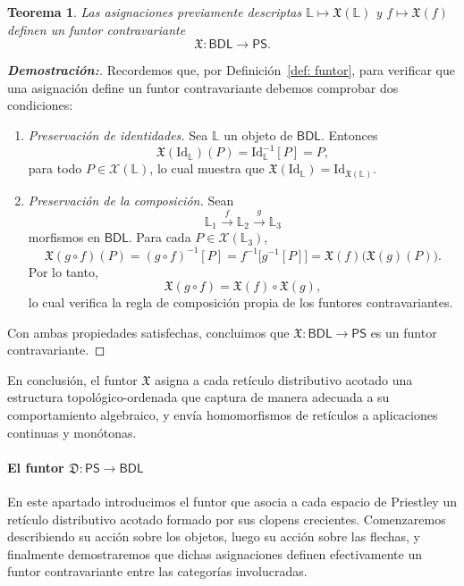 \documentclass[12pt]{book}
\newtheorem{theorem}{Teorema}[section]
\newcommand{\Id}{\mathrm{Id}}
\newcommand{\X}{\mathfrak{X}}
\newcommand{\D}{\mathfrak{D}}
\begin{document}
\begin{theorem}\label{thm:X-functor}
Las asignaciones previamente descriptas \( \mathbb{L}\mapsto\X(\mathbb{L}) \) y \( f\mapsto\X(f) \)
definen un funtor contravariante
\[
\X\colon \mathsf{BDL}\to\mathsf{PS}.
\]
\end{theorem}

\begin{proof}[{\textbf{Demostración:}}]
Recordemos que, por Definición~\ref{def: funtor}, para verificar que una asignación
define un funtor contravariante debemos comprobar dos condiciones:
\begin{enumerate}
    \item \emph{Preservación de identidades.}  
Sea \( \mathbb{L} \) un objeto de \( \mathsf{BDL} \).  
Entonces
\[
\X(\Id_{\mathbb{L}})(P)=\Id_{\mathbb{L}}^{-1}[P]=P,
\]
para todo \( P\in\mathcal{X}(\mathbb{L}) \), lo cual muestra que  
\( \X(\Id_{\mathbb{L}})=\Id_{\X(\mathbb{L})} \).
    \item \emph{Preservación de la composición.}  
Sean
\[
\mathbb{L}_{1}\xrightarrow{f}\mathbb{L}_{2}\xrightarrow{g}\mathbb{L}_{3}
\]
morfismos en \( \mathsf{BDL} \). Para cada \( P\in\mathcal{X}(\mathbb{L}_{3}) \),
\[
\X(g\circ f)(P)
=(g\circ f)^{-1}[P]
=f^{-1}\bigl[g^{-1}[P]\bigr]
=\X(f)\bigl(\X(g)(P)\bigr).
\]
Por lo tanto,
\[
\X(g\circ f)=\X(f)\circ\X(g),
\]
lo cual verifica la regla de composición propia de los funtores contravariantes.
\end{enumerate}
Con ambas propiedades satisfechas, concluimos que
\(
\X\colon\mathsf{BDL}\to\mathsf{PS}
\)
es un funtor contravariante.
\end{proof}
En conclusión, el funtor $\X$ asigna a cada retículo distributivo acotado una estructura topológico-ordenada que captura de manera adecuada a su comportamiento algebraico, y envía homomorfismos de retículos a aplicaciones continuas y monótonas.


\paragraph{El funtor \(\D\colon \mathsf{PS}\to\mathsf{BDL}\)}\;

\medskip

En este apartado introducimos el funtor que asocia a cada espacio de Priestley un retículo distributivo acotado formado por sus clopens crecientes. 
Comenzaremos describiendo su acción sobre los objetos, luego su acción sobre las flechas, 
y finalmente demostraremos que dichas asignaciones definen efectivamente un funtor 
contravariante entre las categorías involucradas.
\end{document}
